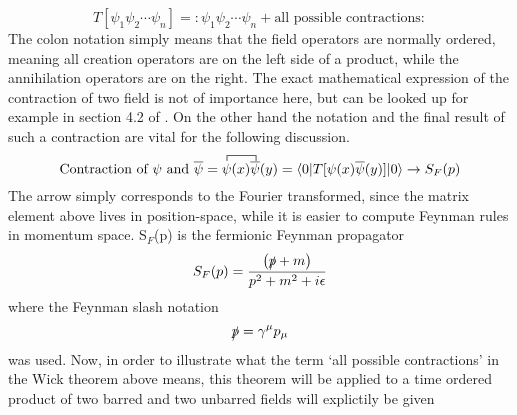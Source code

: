 \begin{equation*}
	T\left[\psi_1\psi_2\cdots\psi_n\right]=:\psi_1\psi_2\cdots\psi_n+\text{all possible contractions}:
\end{equation*}
The colon notation simply means that the field operators are normally ordered, meaning all creation operators are on the left side of a product, while the annihilation operators are on the right. The exact mathematical expression of the contraction of two field is not of importance here, but can be looked up for example in section 4.2 of \cite{Kopp:2016}. On the other hand the notation and the final result of such a contraction are vital for the following discussion.
\begin{equation*}
\text{Contraction of $\psi$ and $\overline{\psi}$}=
\contraction{}{\psi}{(x)}{\bar{\psi}}
\psi(x)\overline{\psi}(y)=\braket{0|T[\psi(x)\overline{\psi}(y)]|0}\rightarrow S_F(p)
\end{equation*}
The arrow simply corresponds to the Fourier transformed, since the matrix element above lives in position-space, while it is easier to compute Feynman rules in momentum space. S$_F$(p) is the fermionic Feynman propagator
\begin{equation*}
	S_F(p)=\frac{\left(\slashed p+m\right)}{p^2+m^2+i\epsilon}
\end{equation*}
where the Feynman slash notation
\begin{equation*}
	\slashed p=\gamma^\mu p_\mu
\end{equation*}
was used.
Now, in order to illustrate what the term `all possible contractions' in the Wick theorem above means, this theorem will be applied to a time ordered product of two barred and two unbarred fields will explictily be given
